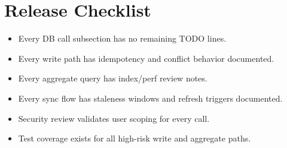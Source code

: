 \documentclass[11pt]{article}
\begin{document}
\section{Release Checklist}
\begin{itemize}[leftmargin=1.5em]
\item Every DB call subsection has no remaining TODO lines.
\item Every write path has idempotency and conflict behavior documented.
\item Every aggregate query has index/perf review notes.
\item Every sync flow has staleness windows and refresh triggers documented.
\item Security review validates user scoping for every call.
\item Test coverage exists for all high-risk write and aggregate paths.
\end{itemize}
\end{document}
